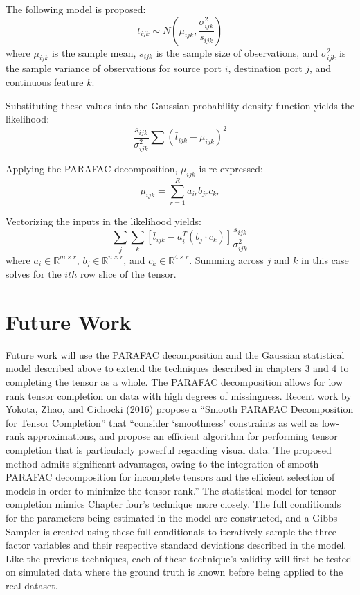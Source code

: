 \documentclass[12pt,twoside]{dukestatscithesis}
\theoremstyle{definition}
\theoremstyle{definition}
\theoremstyle{definition}
\theoremstyle{remark}
\begin{document}
The following model is proposed:
\[t_{ijk} \sim N(\mu_{ijk}, \frac{\sigma^2_{ijk}}{s_{ijk}})\] where
\(\mu_{ijk}\) is the sample mean, \(s_{ijk}\) is the sample size of
observations, and \(\sigma^2_{ijk}\) is the sample variance of
observations for source port \(i\), destination port \(j\), and
continuous feature \(k\).

Substituting these values into the Gaussian probability density function
yields the likelihood:
\[\frac{s_{ijk}}{\sigma^2_{ijk}}\sum(\bar t_{ijk} - \mu_{ijk})^2\]

Applying the PARAFAC decomposition, \(\mu_{ijk}\) is re-expressed:
\[\mu_{ijk} = \sum_{r=1}^Ra_{ir}b_{jr}c_{kr}\]

Vectorizing the inputs in the likelihood yields:
\[\sum_j\sum_k[\bar t_{ijk} - a_i^T(b_j \cdotp c_k)]\frac{s_{ijk}}{\sigma^2_{ijk}}\]
where \(a_i \in \mathbb{R}^{m \times r}\),
\(b_j \in \mathbb{R}^{n \times r}\), and
\(c_k \in \mathbb{R}^{4 \times r}\). Summing across \(j\) and \(k\) in
this case solves for the \(ith\) row slice of the tensor.

\section{Future Work}\label{future-work}

Future work will use the PARAFAC decomposition and the Gaussian
statistical model described above to extend the techniques described in
chapters 3 and 4 to completing the tensor as a whole. The PARAFAC
decomposition allows for low rank tensor completion on data with high
degrees of missingness. Recent work by Yokota, Zhao, and Cichocki (2016)
propose a ``Smooth PARAFAC Decomposition for Tensor Completion'' that
``consider `smoothness' constraints as well as low-rank approximations,
and propose an efficient algorithm for performing tensor completion that
is particularly powerful regarding visual data. The proposed method
admits significant advantages, owing to the integration of smooth
PARAFAC decomposition for incomplete tensors and the efficient selection
of models in order to minimize the tensor rank.'' The statistical model
for tensor completion mimics Chapter four's technique more closely. The
full conditionals for the parameters being estimated in the model are
constructed, and a Gibbs Sampler is created using these full
conditionals to iteratively sample the three factor variables and their
respective standard deviations described in the model. Like the previous
techniques, each of these technique's validity will first be tested on
simulated data where the ground truth is known before being applied to
the real dataset.
\end{document}
